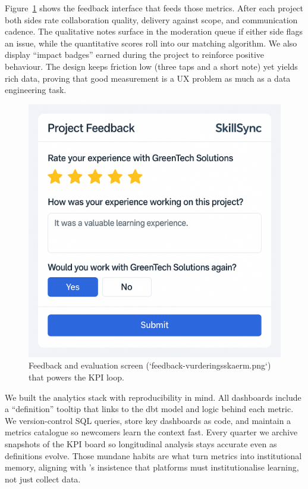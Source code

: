 Figure~\ref{fig:feedback-screen} shows the feedback interface that feeds those metrics. After each project both sides rate collaboration quality, delivery against scope, and communication cadence. The qualitative notes surface in the moderation queue if either side flags an issue, while the quantitative scores roll into our matching algorithm. We also display ``impact badges'' earned during the project to reinforce positive behaviour. The design keeps friction low (three taps and a short note) yet yields rich data, proving that good measurement is a UX problem as much as a data engineering task.

\begin{figure}[h]
  \centering
  \includegraphics[width=0.8\linewidth]{figures/feedback-vurderingsskaerm.png}
  \caption{Feedback and evaluation screen (`feedback-vurderingsskaerm.png`) that powers the KPI loop.}
  \label{fig:feedback-screen}
\end{figure}

We built the analytics stack with reproducibility in mind. All dashboards include a ``definition'' tooltip that links to the dbt model and logic behind each metric. We version-control SQL queries, store key dashboards as code, and maintain a metrics catalogue so newcomers learn the context fast. Every quarter we archive snapshots of the KPI board so longitudinal analysis stays accurate even as definitions evolve. Those mundane habits are what turn metrics into institutional memory, aligning with \citet{Choudary2016}'s insistence that platforms must institutionalise learning, not just collect data.
